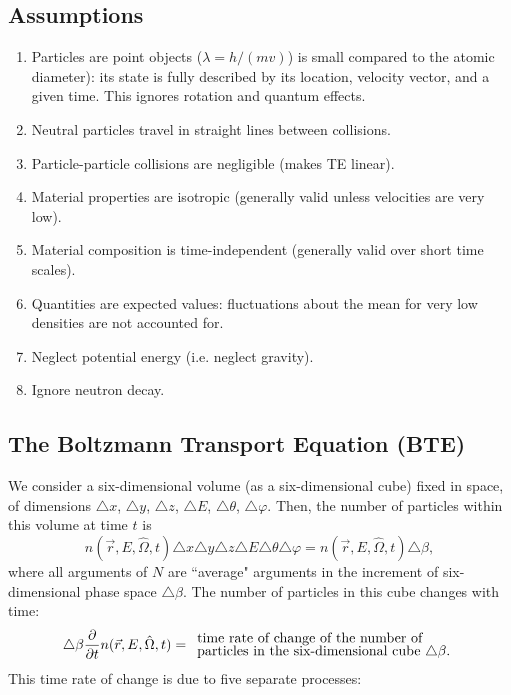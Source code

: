 \documentclass[12pt]{article}
\newcommand{\rvec}{\ensuremath{\vec{r}}}
\newcommand{\omvec}{\ensuremath{\hat{\Omega}}}
\begin{document}
\subsection*{Assumptions}
\begin{enumerate}
\item Particles are point objects ($\lambda = h/(mv)$) is small compared to the atomic diameter): its state is fully described by its location, velocity vector, and a given time. This ignores rotation and quantum effects.

\item Neutral particles travel in straight lines between collisions.

\item Particle-particle collisions are negligible (makes TE linear).

\item Material properties are isotropic (generally valid unless velocities are very low).

\item Material composition is time-independent (generally valid over short time scales).

\item Quantities are expected values: fluctuations about the mean for very low densities are not accounted for.

\item Neglect potential energy (i.e. neglect gravity).

\item Ignore neutron decay.
\end{enumerate}

\subsection*{The Boltzmann Transport Equation (BTE)}
We consider a six-dimensional volume (as a six-dimensional cube)
 fixed in space, of dimensions
$\triangle x$, $\triangle y$, $\triangle z$, $\triangle E$, $\triangle \theta$, $\triangle \varphi$.
Then, the number of particles within this volume at time $t$ is
\begin{equation*}
n(\rvec,E,\omvec,t)\triangle x\triangle y\triangle z\triangle E\triangle \theta\triangle \varphi =
n(\rvec,E,\omvec,t)\triangle \beta,
\end{equation*}
where all arguments of $N$ are ``average" arguments in the %
increment of six-dimensional phase space $\triangle \beta$.
The number of
particles in this cube changes with time:
\begin{equation*}
\triangle \beta\frac{\partial}{\partial t}n(\rvec,E,\omvec,t) = \begin{array}{l}
\text{time rate of change of the number of}\vspace{-0.1cm}\\
\text{particles in the six-dimensional cube $\triangle \beta$.}
\end{array}
\end{equation*}
 This time rate of change is due to five separate processes:
 
\end{document}
